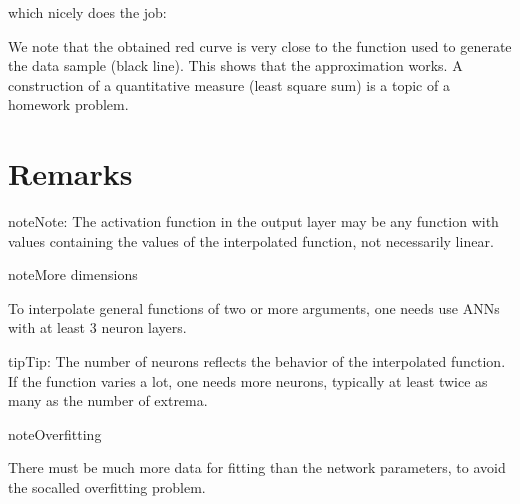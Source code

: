 \documentclass[letterpaper,10pt,english]{jupyterBook}
\begin{document}
\sphinxAtStartPar
which nicely does the job:

\noindent{}

\sphinxAtStartPar
We note that the obtained red curve is very close to the function used to generate the data sample (black line). This shows that the approximation works. A construction of a quantitative measure (least square sum) is a topic of a homework problem.


\section{Remarks}
\label{\detokenize{docs/interpol:remarks}}
\begin{sphinxadmonition}{note}{Note:}
\sphinxAtStartPar
The activation function in the output layer may be any function with values containing the values of the interpolated function, not necessarily linear.
\end{sphinxadmonition}

\begin{sphinxadmonition}{note}{More dimensions}

\sphinxAtStartPar
To interpolate general functions of two or more arguments, one needs use ANNs with at least 3 neuron layers.
\end{sphinxadmonition}

\begin{sphinxadmonition}{tip}{Tip:}
\sphinxAtStartPar
The number of neurons reflects the behavior of the interpolated function. If the function varies a lot, one needs more neurons, typically at least twice as many as the number of extrema.
\end{sphinxadmonition}

\begin{sphinxadmonition}{note}{Overfitting}

\sphinxAtStartPar
There must be much more data for fitting than the network parameters, to avoid the so\sphinxhyphen{}called overfitting problem.
\end{sphinxadmonition}
\end{document}
